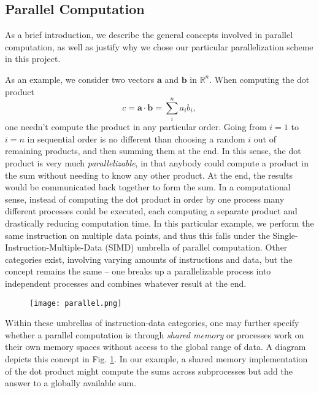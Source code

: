 \documentclass[reprint, amsmath, amssymb, aps, floatfix]{revtex4-1}
\newcommand{\bv}[1]{\mathbf{#1}}
\begin{document}
\subsection{Parallel Computation}

As a brief introduction, we describe the general concepts involved in parallel computation, as well as justify why we chose our particular parallelization scheme in this project.

As an example, we consider two vectors $\bv{a}$ and $\bv{b}$ in $\mathbb{R}^n$. When computing the dot product $$c = \bv{a}\cdot\bv{b}=\sum_i^n a_ib_i,$$ one needn't compute the product in any particular order. Going from $i=1$ to $i=n$ in sequential order is no different than choosing a random $i$ out of remaining products, and then summing them at the end. In this sense, the dot product is very much \textit{parallelizable}, in that anybody could compute a product in the sum without needing to know any other product. At the end, the results would be communicated back together to form the sum. In a computational sense, instead of computing the dot product in order by one process many different processes could be executed, each computing a separate product and drastically reducing computation time. In this particular example, we perform the same instruction on multiple data points, and thus this falls under the Single-Instruction-Multiple-Data (SIMD) umbrella of parallel computation. Other categories exist, involving varying amounts of instructions and data, but the concept remains the same -- one breaks up a parallelizable process into independent processes and combines whatever result at the end.


\begin{figure}
\texttt{[image: parallel.png]}
\label{pic}
\end{figure}

Within these umbrellas of instruction-data categories, one may further specify whether a parallel computation is through \textit{shared memory} or processes work on their own memory spaces without access to the global range of data. A diagram depicts this concept in Fig. \ref{pic}. In our example, a shared memory implementation of the dot product might compute the sums across subprocesses but add the answer to a globally available sum.
\end{document}
